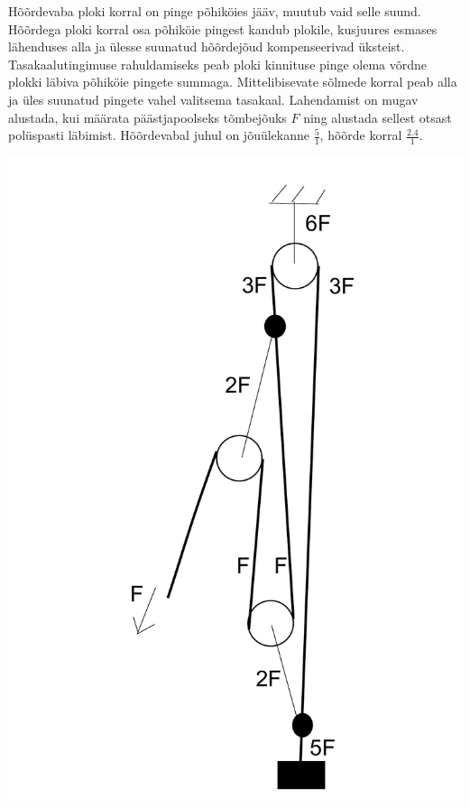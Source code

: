 \documentclass[11pt]{article}
\begin{document}
{{\ifSolution
Hõõrdevaba ploki korral on pinge põhiköies jääv, muutub vaid selle suund. Hõõrdega ploki korral osa põhiköie pingest kandub plokile, kusjuures esmases lähenduses alla ja ülesse suunatud hõõrdejõud kompenseerivad üksteist. Tasakaalutingimuse rahuldamiseks peab ploki kinnituse pinge olema võrdne plokki läbiva põhiköie pingete summaga. Mittelibisevate sõlmede korral peab alla ja üles suunatud pingete vahel valitsema tasakaal. Lahendamist on mugav alustada, kui määrata päästjapoolseks tõmbejõuks $F$ ning alustada sellest otsast polüspasti läbimist. Hõõrdevabal juhul on jõuülekanne $\frac{5}{1}$, hõõrde korral $\frac{\num{2,4}}{1}$.

\begin{center}
\includegraphics[scale=0.25]{2014-v3g-06-PolyspastL1}

\end{center}}}
\end{document}
